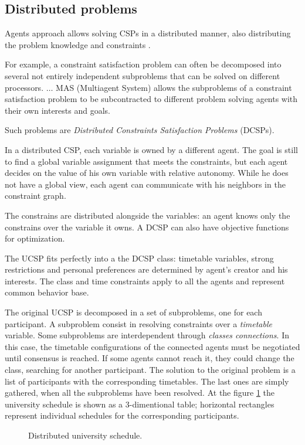 \bigskip

\todo {}



\subsection{Distributed problems}
Agents approach allows solving CSPs in a distributed manner, also distributing
the problem knowledge and constraints
\cite{DCSPagent1998, DCSP2013, CSPagent2014, MAS, MAS-Survey}.

\begin{displayquote} %
  For example, a constraint satisfaction problem can often be
  decomposed into several not entirely independent
  subproblems that can be solved on different processors. $\dots$
  MAS (Multiagent System) allows the subproblems of a constraint satisfaction
  problem to be subcontracted to different problem solving agents with their own
  interests and goals.
\end{displayquote}

\noindent
Such problems are \emph{Distributed Constraints Satisfaction Problems} (DCSPs).
\begin{displayquote} %
  In a distributed CSP, each variable is owned by a different agent. The goal is
  still to find a global variable assignment that meets the constraints, but each agent
  decides on the value of his own variable with relative autonomy. While he does
  not have a global view, each agent can communicate with his neighbors in the
  constraint graph.
\end{displayquote}

  The constrains are distributed alongside the variables: an agent knows only the
constrains over the variable it owns. A DCSP can also have objective functions for
optimization.

  The UCSP fits perfectly into a the DCSP class: timetable variables,
strong restrictions and personal preferences are determined by agent's creator
and his interests. The class and time constraints apply to all the agents and
represent common behavior base.

  The original UCSP is decomposed in a set of subproblems, one for each participant.
A subproblem consist in resolving constraints over a \emph{timetable} variable.
Some subproblems are interdependent through \emph{classes connections}. In this
case, the timetable configurations of the connected agents must be negotiated
until consensus is reached. If some agents cannot reach it, they could change the
class, searching for another participant.
  The solution to the original problem is a list of participants with the corresponding
timetables. The last ones are simply gathered, when all the subproblems have been
resolved. At the figure \ref{fig:ScheduleSpace} the university schedule is
shown as a 3-dimentional table; horizontal rectangles represent individual
schedules for the corresponding participants.

\begin{figure}
  
  \caption{Distributed university schedule.}
  \label{fig:ScheduleSpace}
\end{figure}
